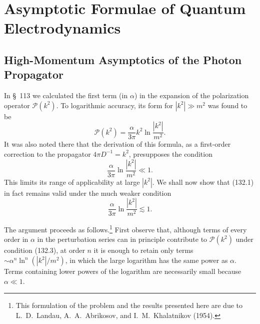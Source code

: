\setcounter{chapter}{12}
\chapter{Asymptotic Formulae of Quantum Electrodynamics}
\setcounter{section}{131}
\section{High-Momentum Asymptotics of the Photon Propagator}

In \S~113 we calculated the first term (in $\alpha$) in the expansion of the polarization operator $\mathcal P(k^2)$. To logarithmic accuracy, its form for $|k^2|\gg m^2$ was found to be
\begin{equation}
\mathcal P(k^2)=\frac{\alpha}{3\pi}k^2\ln\frac{|k^2|}{m^2}.
\tag{132.1}
\end{equation}
It was also noted there that the derivation of this formula, as a first-order correction to the propagator $4\pi D^{-1}=k^2$, presupposes the condition
\begin{equation}
\frac{\alpha}{3\pi}\ln\frac{|k^2|}{m^2}\ll 1.
\tag{132.2}
\end{equation}
This limits its range of applicability at large $|k^2|$. We shall now show that (132.1) in fact remains valid under the much weaker condition
\begin{equation}
\frac{\alpha}{3\pi}\ln\frac{|k^2|}{m^2}\lesssim 1.
\tag{132.3}
\end{equation}

The argument proceeds as follows.\footnote{This formulation of the problem and the results presented here are due to L.~D.~Landau, A.~A.~Abrikosov, and I.~M.~Khalatnikov (1954).} First observe that, although terms of every order in $\alpha$ in the perturbation series can in principle contribute to $\mathcal P(k^2)$ under condition (132.3), at order $n$ it is enough to retain only terms $\sim\alpha^n\ln^n(|k^2|/m^2)$, in which the large logarithm has the same power as $\alpha$. Terms containing lower powers of the logarithm are necessarily small because $\alpha\ll1$.

